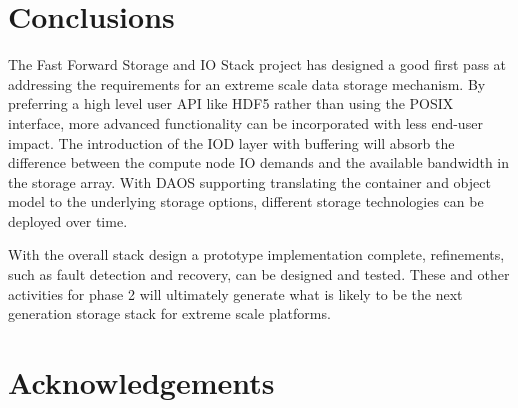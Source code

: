 \documentclass{sig-alt-gov2}
\begin{document}
\section{Conclusions}
\label{sec:conclusion}

The Fast Forward Storage and IO Stack project has designed a good first pass at
addressing the requirements for an extreme scale data storage mechanism.  By
preferring a high level user API like HDF5 rather than using the POSIX
interface, more advanced functionality can be incorporated with less end-user
impact. The introduction of the IOD layer with buffering will absorb the
difference between the compute node IO demands and the available bandwidth in
the storage array. With DAOS supporting translating the container and object
model to the underlying storage options, different storage technologies can be
deployed over time.

With the overall stack design a prototype implementation complete, refinements,
such as fault detection and recovery, can be designed and tested.  These and
other activities for phase 2 will ultimately generate what is likely to be the
next generation storage stack for extreme scale platforms.

\section{Acknowledgements}
\end{document}

